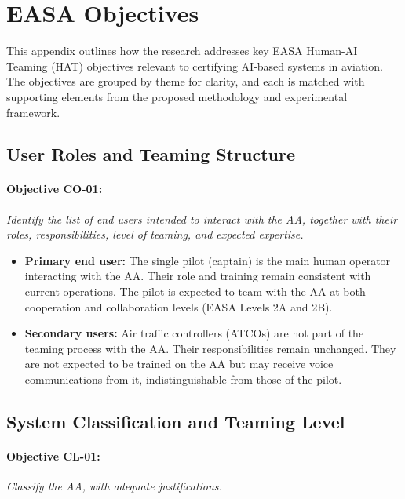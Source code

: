 \documentclass[12pt,a4paper]{article} %
\begin{document}
	\section{EASA Objectives}
	\label{appendix:easa}
	
	This appendix outlines how the research addresses key EASA Human-AI Teaming (HAT) objectives relevant to certifying AI-based systems in aviation. The objectives are grouped by theme for clarity, and each is matched with supporting elements from the proposed methodology and experimental framework.
	
	\subsection*{User Roles and Teaming Structure}
	
	\paragraph{Objective CO-01:} \textit{Identify the list of end users intended to interact with the AA, together with their roles, responsibilities, level of teaming, and expected expertise.}
	
	\begin{itemize}
	  \item \textbf{Primary end user:} The single pilot (captain) is the main human operator interacting with the AA. Their role and training remain consistent with current operations. The pilot is expected to team with the AA at both cooperation and collaboration levels (EASA Levels 2A and 2B).
	  \item \textbf{Secondary users:} Air traffic controllers (ATCOs) are not part of the teaming process with the AA. Their responsibilities remain unchanged. They are not expected to be trained on the AA but may receive voice communications from it, indistinguishable from those of the pilot.
	\end{itemize}
	
	\subsection*{System Classification and Teaming Level}
	
	\paragraph{Objective CL-01:} \textit{Classify the AA, with adequate justifications.}
	
\end{document}
